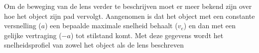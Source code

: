 Om de beweging van de lens verder te beschrijven moet er meer bekend zijn over hoe het object zijn pad vervolgt. Aangenomen is dat het object met een constante versnelling ($a$) een bepaalde maximale snelheid behaalt ($v_e$) en dan met een gelijke vertraging ($-a$) tot stilstand komt. Met deze gegevens wordt het snelheidsprofiel van zowel het object als de lens beschreven




